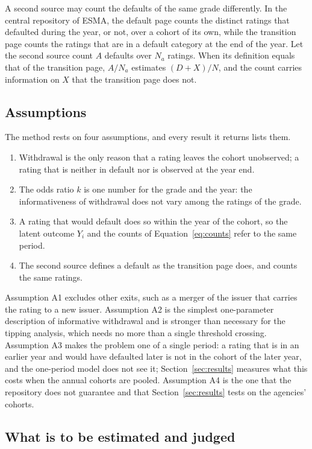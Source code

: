 A second source may count the defaults of the same grade differently. In the central repository of ESMA, the default page counts the distinct ratings that defaulted during the year, \wdn{} or not, over a cohort of its own, while the transition page counts the ratings that are in a default category at the end of the year. Let the second source count $A$ defaults over $N_a$ ratings. When its definition equals that of the transition page, $A/N_a$ estimates $(D+X)/N$, and the count carries information on $X$ that the transition page does not.

\subsection{Assumptions}

The method rests on four assumptions, and every result it returns lists them.
\begin{enumerate}
\item[\textbf{A1}] Withdrawal is the only reason that a rating leaves the cohort unobserved; a rating that is neither in default nor \wdn{} is observed at the year end.
\item[\textbf{A2}] The odds ratio $k$ is one number for the grade and the year: the informativeness of withdrawal does not vary among the ratings of the grade.
\item[\textbf{A3}] A \wdn{} rating that would default does so within the year of the cohort, so the latent outcome $Y_i$ and the counts of Equation~\eqref{eq:counts} refer to the same period.
\item[\textbf{A4}] The second source defines a default as the transition page does, and counts the same ratings.
\end{enumerate}
Assumption A1 excludes other exits, such as a merger of the issuer that carries the rating to a new issuer. Assumption A2 is the simplest one-parameter description of informative withdrawal and is stronger than necessary for the tipping analysis, which needs no more than a single threshold crossing. Assumption A3 makes the problem one of a single period: a rating that is \wdn{} in an earlier year and would have defaulted later is not in the cohort of the later year, and the one-period model does not see it; Section~\ref{sec:results} measures what this costs when the annual cohorts are pooled. Assumption A4 is the one that the repository does not guarantee and that Section~\ref{sec:results} tests on the agencies' cohorts.

\subsection{What is to be estimated and judged}

